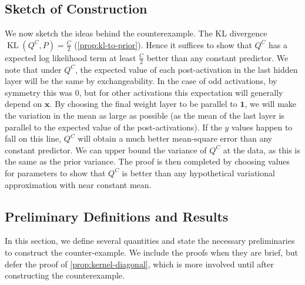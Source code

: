 \documentclass[twoside]{article}
\newcommand{\vx}{\mathbf{x}}
\renewcommand{\P}{\mathbb{P}}
\newcommand{\Q}{\mathbb{Q}}
\renewcommand{\Q}{\ensuremath{Q}}
\renewcommand{\P}{\ensuremath{P}}
\newcommand{\KL}{\operatorname{KL}}
\theoremstyle{theoremstyle}
\begin{document}
\subsection{Sketch of Construction}
We now sketch the ideas behind the counterexample. %
The KL divergence $\KL(\Q^{C},\P)=\frac{C}{2}$ (\cref{prop:kl-to-prior}). Hence it suffices to show that $\Q^{C}$ has a expected log likelihood term at least $\frac{C}{2}$ better than any constant predictor. We note that under $\Q^{C}$, the expected value of each post-activation in the last hidden layer will be the same by exchangeability. In the case of odd activations, by symmetry this was $0$, but for other activations this expectation will generally depend on $\vx$. By choosing the final weight layer to be parallel to $\mathbf{1}$, we will make the variation in the mean as large as possible (as the mean of the last layer is parallel to the expected value of the post-activations). If the $y$ values happen to fall on this line, $\Q^{C}$ will obtain a much better mean-square error than any constant predictor. We can upper bound the variance of $\Q^{C}$ at the data, as this is the same as the prior variance. The proof is then completed by choosing values for parameters to show that $\Q^{C}$ is better than any hypothetical variational approximation with near constant mean.   


\subsection{Preliminary Definitions and Results}

In this section, we define several quantities and state the necessary preliminaries to construct the counter-example. We include the proofs when they are brief, but defer the proof of \cref{prop:kernel-diagonal}, which is more involved until after constructing the counterexample.
\end{document}
